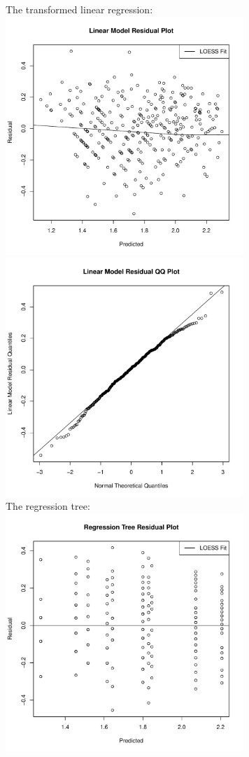 \documentclass[11pt]{article}
\theoremstyle{definition}
\begin{document}
\begin{itemize}
\begin{itemize}
\begin{center}
                \end{center}
                The transformed linear regression: \\
                    \includegraphics[width=9cm]{hw7/hw7_2_b_lm_res} 
                    \includegraphics[width=9cm]{hw7/hw7_2_b_lm_qq} \\ 
                The regression tree: \\
                    \includegraphics[width=9cm]{hw7/hw7_2_b_rt_res} 

\end{itemize}
\end{itemize}
\end{document}
